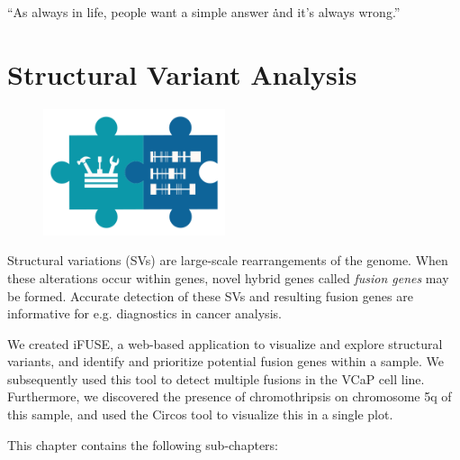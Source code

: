 \cleartorightpage
\begin{savequote}[75mm]
“As always in life, people want a simple answer \. \. \. and it’s always wrong.”
\end{savequote}

\chapter{Structural Variant Analysis}\label{chapter:fusiongenes}
\setcounter{figure}{-1}
\setcounter{table}{-1}
\setcounter{section}{-1}

\begin{figure}[t!]
\includegraphics[height=10em]{frontmatter/images/chapter-header-fusion-tools.png}
\end{figure}
\setcounter{figure}{-1}
\setcounter{table}{-1}
\setcounter{section}{-1}


Structural variations (SVs) are large-scale rearrangements of the genome. When these alterations occur within genes, novel hybrid genes called \emph{fusion genes} may be formed. Accurate detection of these SVs and resulting fusion genes are informative for e.g. diagnostics in cancer analysis.

We created iFUSE, a web-based application to visualize and explore structural variants, and identify and prioritize potential fusion genes within a sample. We subsequently used this tool to detect multiple fusions in the VCaP cell line. Furthermore, we discovered the presence of chromothripsis on chromosome 5q of this sample, and used the Circos tool to visualize this in a single plot.

This chapter contains the following sub-chapters:

